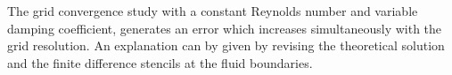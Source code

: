\begin{figure}[!bp]%
    \centering
    \qquad
    \caption{}
\end{figure}

The grid convergence study with a constant Reynolds number and variable damping coefficient, generates an error
which increases simultaneously with the grid resolution.
An explanation can by given by revising the theoretical solution
and the finite difference stencils at the fluid boundaries.

